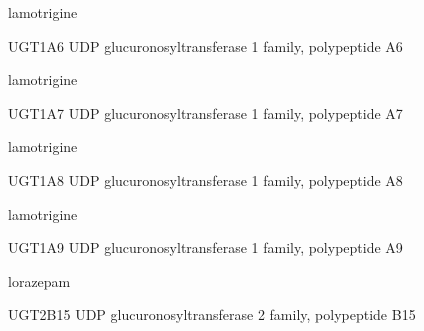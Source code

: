 \documentclass{resume} %
\begin{document}
\begin{rSection}{ lamotrigine }
\begin{rSubsection}{ UGT1A6 }{ UDP glucuronosyltransferase 1 family, polypeptide A6 }{}{}
\end{rSubsection}

\end{rSection}\begin{rSection}{ lamotrigine }
\item[]
\begin{rSubsection}{ UGT1A7 }{ UDP glucuronosyltransferase 1 family, polypeptide A7 }{}{}
\item[]


\end{rSubsection}

\end{rSection}\begin{rSection}{ lamotrigine }
\item[]
\begin{rSubsection}{ UGT1A8 }{ UDP glucuronosyltransferase 1 family, polypeptide A8 }{}{}
\item[]


\end{rSubsection}

\end{rSection}\begin{rSection}{ lamotrigine }
\item[]
\begin{rSubsection}{ UGT1A9 }{ UDP glucuronosyltransferase 1 family, polypeptide A9 }{}{}
\item[]


\end{rSubsection}

\end{rSection}\begin{rSection}{ lorazepam }
\item[]
\begin{rSubsection}{ UGT2B15 }{ UDP glucuronosyltransferase 2 family, polypeptide B15 }{}{}
\item[]


\end{rSubsection}


\end{rSection}
\end{document}
